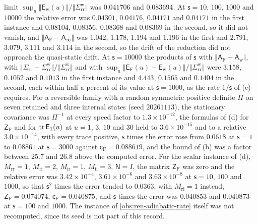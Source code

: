\begin{numcheck}
limit $\sup_u\Vert\mathsf E_{\mathrm w}(u)\Vert/\Vert\Sigma^{\mathrm w}_{\mathrm{rr}}\Vert$ was $0.041706$ and $0.083694$. At $\mathsf s=10$, $100$, $1000$ and $10000$ the relative error was $0.04301$, $0.04176$, $0.04171$ and $0.04171$ in the first instance and $0.08104$, $0.08356$, $0.08368$ and $0.08369$ in the second, so it did not vanish, and $\Vert\mathsf A_{\mathrm F}-\mathsf A_\infty\Vert$ was $1.042$, $1.178$, $1.194$ and $1.196$ in the first and $2.791$, $3.079$, $3.111$ and $3.114$ in the second, so the drift of the reduction did not approach the quasi-static drift. At $\mathsf s=10000$ the products of $\mathsf s$ with $\Vert\mathsf A_{\mathrm F}-\mathsf A_{\mathrm w}\Vert$, with $\Vert\Sigma_{\mathrm{rr}}-\Sigma^{\mathrm w}_{\mathrm{rr}}\Vert/\Vert\Sigma^{\mathrm w}_{\mathrm{rr}}\Vert$ and with $\sup_u\Vert\mathsf E_{\mathrm F}(u)-\mathsf E_{\mathrm w}(u)\Vert/\Vert\Sigma^{\mathrm w}_{\mathrm{rr}}\Vert$ were $3.158$, $0.1052$ and $0.1013$ in the first instance and $4.443$, $0.1565$ and $0.1404$ in the second, each within half a percent of its value at $\mathsf s=1000$, as the rate $1/\mathsf s$ of (e) requires. For a reversible family with a random symmetric positive definite $\Pi$ on seven retained and three internal states (seed $20261113$), the stationary covariance was $\Pi^{-1}$ at every speed factor to $1.3\times10^{-12}$, the formulas of (d) for $\mathsf Z_{\mathrm F}$ and for $\operatorname{tr}\mathsf E_1(u)$ at $u=1$, $3$, $10$ and $30$ held to $3.6\times10^{-15}$ and to a relative $3.0\times10^{-14}$, with every trace positive, $\mathsf s$ times the error rose from $0.0618$ at $\mathsf s=1$ to $0.08861$ at $\mathsf s=3000$ against $\mathsf c_{\mathrm F}=0.088619$, and the bound of (b) was a factor between $25.7$ and $26.8$ above the computed error. For the scalar instance of (d), $M_{\mathrm{rr}}=1$, $M_{\mathrm{ri}}=2$, $M_{\mathrm{ir}}=1$, $M_{\mathrm{ii}}=3$, $\mathsf N=I$, the matrix $\mathsf Z_{\mathrm F}$ was zero and the relative error was $3.42\times10^{-4}$, $3.61\times10^{-6}$ and $3.63\times10^{-8}$ at $\mathsf s=10$, $100$ and $1000$, so that $\mathsf s^2$ times the error tended to $0.0363$; with $M_{\mathrm{ri}}=1$ instead, $\mathsf Z_{\mathrm F}=0.074074$, $\mathsf c_{\mathrm F}=0.040875$, and $\mathsf s$ times the error was $0.040853$ and $0.040873$ at $\mathsf s=100$ and $1000$. The instance of \cref{obs:ren-adiabatic-rate} itself was not recomputed, since its seed is not part of this record.
\end{numcheck}

